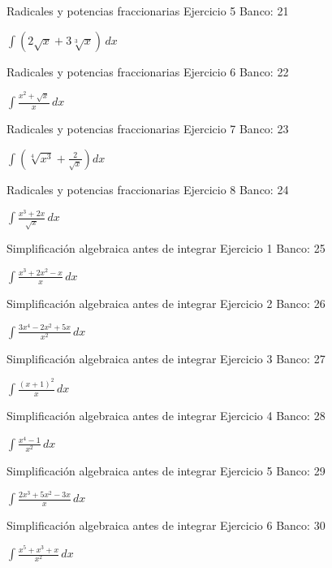 \documentclass[aspectratio=169,12pt]{beamer}
\newcommand{\ejercicio}[1]{%
  \begin{center}
  \vfill
  {\fontsize{24}{30}\selectfont #1}
  \vfill
  \end{center}
}
\begin{document}
\begin{frame}{Radicales y potencias fraccionarias}
\small Ejercicio 5 \hfill Banco: 21
\ejercicio{$\displaystyle \int(2\sqrt{x}+3\sqrt[3]{x})\,dx$}
\end{frame}

\begin{frame}{Radicales y potencias fraccionarias}
\small Ejercicio 6 \hfill Banco: 22
\ejercicio{$\displaystyle \int\frac{x^2+\sqrt{x}}{x}\,dx$}
\end{frame}

\begin{frame}{Radicales y potencias fraccionarias}
\small Ejercicio 7 \hfill Banco: 23
\ejercicio{$\displaystyle \int\left(\sqrt[4]{x^3}+\frac{2}{\sqrt{x}}\right)dx$}
\end{frame}

\begin{frame}{Radicales y potencias fraccionarias}
\small Ejercicio 8 \hfill Banco: 24
\ejercicio{$\displaystyle \int\frac{x^3+2x}{\sqrt{x}}\,dx$}
\end{frame}

\begin{frame}{Simplificación algebraica antes de integrar}
\small Ejercicio 1 \hfill Banco: 25
\ejercicio{$\displaystyle \int\frac{x^3+2x^2-x}{x}\,dx$}
\end{frame}

\begin{frame}{Simplificación algebraica antes de integrar}
\small Ejercicio 2 \hfill Banco: 26
\ejercicio{$\displaystyle \int\frac{3x^4-2x^2+5x}{x^2}\,dx$}
\end{frame}

\begin{frame}{Simplificación algebraica antes de integrar}
\small Ejercicio 3 \hfill Banco: 27
\ejercicio{$\displaystyle \int\frac{(x+1)^2}{x}\,dx$}
\end{frame}

\begin{frame}{Simplificación algebraica antes de integrar}
\small Ejercicio 4 \hfill Banco: 28
\ejercicio{$\displaystyle \int\frac{x^4-1}{x^2}\,dx$}
\end{frame}

\begin{frame}{Simplificación algebraica antes de integrar}
\small Ejercicio 5 \hfill Banco: 29
\ejercicio{$\displaystyle \int\frac{2x^3+5x^2-3x}{x}\,dx$}
\end{frame}

\begin{frame}{Simplificación algebraica antes de integrar}
\small Ejercicio 6 \hfill Banco: 30
\ejercicio{$\displaystyle \int\frac{x^5+x^3+x}{x^2}\,dx$}
\end{frame}
\end{document}

